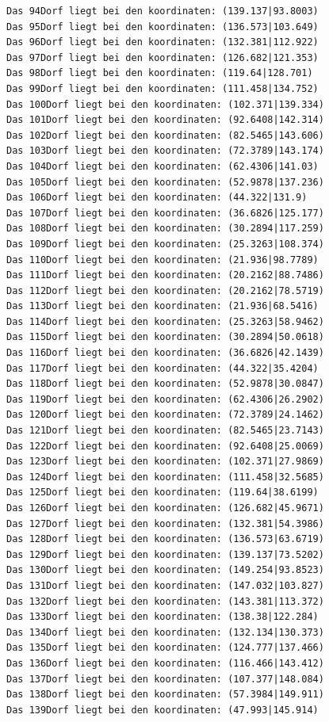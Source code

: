 \documentclass{article}
\begin{document}
\begin{verbatim}
Das 94Dorf liegt bei den koordinaten: (139.137|93.8003)
Das 95Dorf liegt bei den koordinaten: (136.573|103.649)
Das 96Dorf liegt bei den koordinaten: (132.381|112.922)
Das 97Dorf liegt bei den koordinaten: (126.682|121.353)
Das 98Dorf liegt bei den koordinaten: (119.64|128.701)
Das 99Dorf liegt bei den koordinaten: (111.458|134.752)
Das 100Dorf liegt bei den koordinaten: (102.371|139.334)
Das 101Dorf liegt bei den koordinaten: (92.6408|142.314)
Das 102Dorf liegt bei den koordinaten: (82.5465|143.606)
Das 103Dorf liegt bei den koordinaten: (72.3789|143.174)
Das 104Dorf liegt bei den koordinaten: (62.4306|141.03)
Das 105Dorf liegt bei den koordinaten: (52.9878|137.236)
Das 106Dorf liegt bei den koordinaten: (44.322|131.9)
Das 107Dorf liegt bei den koordinaten: (36.6826|125.177)
Das 108Dorf liegt bei den koordinaten: (30.2894|117.259)
Das 109Dorf liegt bei den koordinaten: (25.3263|108.374)
Das 110Dorf liegt bei den koordinaten: (21.936|98.7789)
Das 111Dorf liegt bei den koordinaten: (20.2162|88.7486)
Das 112Dorf liegt bei den koordinaten: (20.2162|78.5719)
Das 113Dorf liegt bei den koordinaten: (21.936|68.5416)
Das 114Dorf liegt bei den koordinaten: (25.3263|58.9462)
Das 115Dorf liegt bei den koordinaten: (30.2894|50.0618)
Das 116Dorf liegt bei den koordinaten: (36.6826|42.1439)
Das 117Dorf liegt bei den koordinaten: (44.322|35.4204)
Das 118Dorf liegt bei den koordinaten: (52.9878|30.0847)
Das 119Dorf liegt bei den koordinaten: (62.4306|26.2902)
Das 120Dorf liegt bei den koordinaten: (72.3789|24.1462)
Das 121Dorf liegt bei den koordinaten: (82.5465|23.7143)
Das 122Dorf liegt bei den koordinaten: (92.6408|25.0069)
Das 123Dorf liegt bei den koordinaten: (102.371|27.9869)
Das 124Dorf liegt bei den koordinaten: (111.458|32.5685)
Das 125Dorf liegt bei den koordinaten: (119.64|38.6199)
Das 126Dorf liegt bei den koordinaten: (126.682|45.9671)
Das 127Dorf liegt bei den koordinaten: (132.381|54.3986)
Das 128Dorf liegt bei den koordinaten: (136.573|63.6719)
Das 129Dorf liegt bei den koordinaten: (139.137|73.5202)
Das 130Dorf liegt bei den koordinaten: (149.254|93.8523)
Das 131Dorf liegt bei den koordinaten: (147.032|103.827)
Das 132Dorf liegt bei den koordinaten: (143.381|113.372)
Das 133Dorf liegt bei den koordinaten: (138.38|122.284)
Das 134Dorf liegt bei den koordinaten: (132.134|130.373)
Das 135Dorf liegt bei den koordinaten: (124.777|137.466)
Das 136Dorf liegt bei den koordinaten: (116.466|143.412)
Das 137Dorf liegt bei den koordinaten: (107.377|148.084)
Das 138Dorf liegt bei den koordinaten: (57.3984|149.911)
Das 139Dorf liegt bei den koordinaten: (47.993|145.914)

\end{verbatim}
\end{document}
